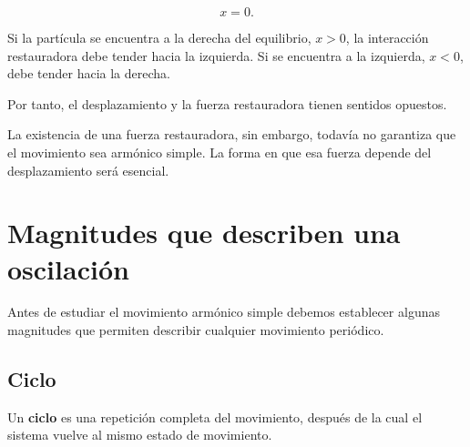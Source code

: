 \[ x=0. \]

Si la partícula se encuentra a la derecha del equilibrio, \(x>0\), la interacción restauradora debe tender hacia la izquierda. Si se encuentra a la izquierda, \(x<0\), debe tender hacia la derecha.

Por tanto, el desplazamiento y la fuerza restauradora tienen sentidos opuestos.

\begin{center}
\end{center}

La existencia de una fuerza restauradora, sin embargo, todavía no garantiza que el movimiento sea armónico simple. La forma en que esa fuerza depende del desplazamiento será esencial.

\section{Magnitudes que describen una oscilación}

Antes de estudiar el movimiento armónico simple debemos establecer algunas magnitudes que permiten describir cualquier movimiento periódico.

\subsection{Ciclo}

\begin{definicion}[Ciclo]
Un \textbf{ciclo} es una repetición completa del movimiento, después de la cual el sistema vuelve al mismo estado de movimiento.
\end{definicion}

